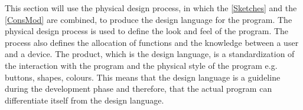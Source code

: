 This section will use the physical design process, in which the  \cref{Sketches} and the  \cref{ConsMod} are combined, to produce the design language for the program. The physical design process is used to define the look and feel of the program. The process also defines the allocation of functions and the knowledge between a user and a device. The product, which is the design language, is a standardization of the interaction with the program and the physical style of the program e.g. buttons, shapes, colours. This means that the design language is a guideline during the development phase and therefore, that the actual program can differentiate itself from the design language.